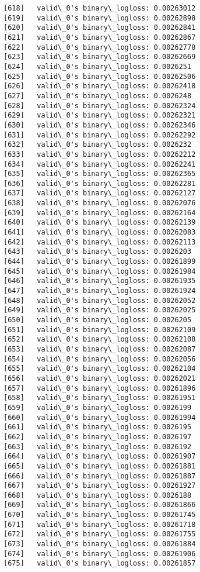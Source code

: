 \documentclass[11pt]{article}
\begin{document}
\begin{Verbatim}[commandchars=\\\{\}]
[618]	valid\_0's binary\_logloss: 0.00263012
[619]	valid\_0's binary\_logloss: 0.00262898
[620]	valid\_0's binary\_logloss: 0.00262841
[621]	valid\_0's binary\_logloss: 0.00262867
[622]	valid\_0's binary\_logloss: 0.00262778
[623]	valid\_0's binary\_logloss: 0.00262669
[624]	valid\_0's binary\_logloss: 0.0026251
[625]	valid\_0's binary\_logloss: 0.00262506
[626]	valid\_0's binary\_logloss: 0.00262418
[627]	valid\_0's binary\_logloss: 0.0026248
[628]	valid\_0's binary\_logloss: 0.00262324
[629]	valid\_0's binary\_logloss: 0.00262321
[630]	valid\_0's binary\_logloss: 0.00262346
[631]	valid\_0's binary\_logloss: 0.00262292
[632]	valid\_0's binary\_logloss: 0.0026232
[633]	valid\_0's binary\_logloss: 0.00262212
[634]	valid\_0's binary\_logloss: 0.00262241
[635]	valid\_0's binary\_logloss: 0.00262365
[636]	valid\_0's binary\_logloss: 0.00262281
[637]	valid\_0's binary\_logloss: 0.00262127
[638]	valid\_0's binary\_logloss: 0.00262076
[639]	valid\_0's binary\_logloss: 0.00262164
[640]	valid\_0's binary\_logloss: 0.00262139
[641]	valid\_0's binary\_logloss: 0.00262083
[642]	valid\_0's binary\_logloss: 0.00262113
[643]	valid\_0's binary\_logloss: 0.0026203
[644]	valid\_0's binary\_logloss: 0.00261899
[645]	valid\_0's binary\_logloss: 0.00261984
[646]	valid\_0's binary\_logloss: 0.00261935
[647]	valid\_0's binary\_logloss: 0.00261924
[648]	valid\_0's binary\_logloss: 0.00262052
[649]	valid\_0's binary\_logloss: 0.00262025
[650]	valid\_0's binary\_logloss: 0.0026205
[651]	valid\_0's binary\_logloss: 0.00262109
[652]	valid\_0's binary\_logloss: 0.00262108
[653]	valid\_0's binary\_logloss: 0.00262087
[654]	valid\_0's binary\_logloss: 0.00262056
[655]	valid\_0's binary\_logloss: 0.00262104
[656]	valid\_0's binary\_logloss: 0.00262021
[657]	valid\_0's binary\_logloss: 0.00261896
[658]	valid\_0's binary\_logloss: 0.00261951
[659]	valid\_0's binary\_logloss: 0.0026199
[660]	valid\_0's binary\_logloss: 0.00261994
[661]	valid\_0's binary\_logloss: 0.0026195
[662]	valid\_0's binary\_logloss: 0.0026197
[663]	valid\_0's binary\_logloss: 0.0026192
[664]	valid\_0's binary\_logloss: 0.00261907
[665]	valid\_0's binary\_logloss: 0.00261881
[666]	valid\_0's binary\_logloss: 0.00261887
[667]	valid\_0's binary\_logloss: 0.00261927
[668]	valid\_0's binary\_logloss: 0.0026188
[669]	valid\_0's binary\_logloss: 0.00261866
[670]	valid\_0's binary\_logloss: 0.00261745
[671]	valid\_0's binary\_logloss: 0.00261718
[672]	valid\_0's binary\_logloss: 0.00261755
[673]	valid\_0's binary\_logloss: 0.00261884
[674]	valid\_0's binary\_logloss: 0.00261906
[675]	valid\_0's binary\_logloss: 0.00261857

\end{Verbatim}
\end{document}
